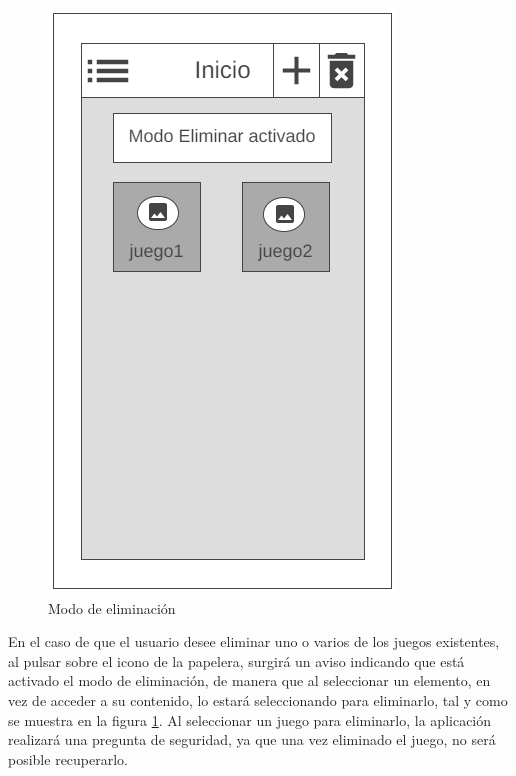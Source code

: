 \begin{figure}[H]
\begin{minipage}{0.38\textwidth}
        \includegraphics[scale=0.5]{Figures/Mockups/Mock_Eliminar.png}
        \caption{Modo de eliminación}
        \label{ModoEliminacion}    
    \end{minipage}
\end{figure}


En el caso de que el usuario desee eliminar uno o varios de los juegos existentes, al pulsar sobre el 
icono de la papelera, surgirá un aviso indicando que está activado el modo de eliminación, de manera que 
al seleccionar un elemento, en vez de acceder a su contenido, lo estará seleccionando para eliminarlo, tal 
y como se muestra en la figura \ref*{ModoEliminacion}. Al seleccionar un juego para eliminarlo, 
la aplicación realizará una pregunta de seguridad, ya que una vez eliminado el juego, no será posible 
recuperarlo.


